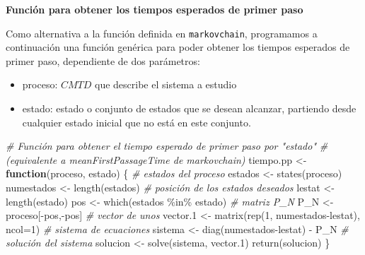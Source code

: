 \documentclass[
]{book}
\newenvironment{Shaded}{\begin{snugshade}}{\end{snugshade}}
\newcommand{\AttributeTok}[1]{\textcolor[rgb]{0.77,0.63,0.00}{#1}}
\newcommand{\CommentTok}[1]{\textcolor[rgb]{0.56,0.35,0.01}{\textit{#1}}}
\newcommand{\ControlFlowTok}[1]{\textcolor[rgb]{0.13,0.29,0.53}{\textbf{#1}}}
\newcommand{\DecValTok}[1]{\textcolor[rgb]{0.00,0.00,0.81}{#1}}
\newcommand{\FloatTok}[1]{\textcolor[rgb]{0.00,0.00,0.81}{#1}}
\newcommand{\FunctionTok}[1]{\textcolor[rgb]{0.00,0.00,0.00}{#1}}
\newcommand{\NormalTok}[1]{#1}
\newcommand{\OtherTok}[1]{\textcolor[rgb]{0.56,0.35,0.01}{#1}}
\newcommand{\SpecialCharTok}[1]{\textcolor[rgb]{0.00,0.00,0.00}{#1}}
\providecommand{\tightlist}{%
  \setlength{\itemsep}{0pt}\setlength{\parskip}{0pt}}
\newenvironment{whitebox}{
  \definecolor{shadecolor}{rgb}{255, 255, 255}  
  \color{black}
  \begin{shaded}}
 {\end{shaded}}
\theoremstyle{definition}
\theoremstyle{definition}
\theoremstyle{definition}
\theoremstyle{definition}
\theoremstyle{remark}
\begin{document}
\begin{whitebox}

\textbf{Función para obtener los tiempos esperados de primer paso}

Como alternativa a la función definida en \texttt{markovchain}, programamos a continuación una función genérica para poder obtener los tiempos esperados de primer paso, dependiente de dos parámetros:

\begin{itemize}
\tightlist
\item
  proceso: \(CMTD\) que describe el sistema a estudio
\item
  estado: estado o conjunto de estados que se desean alcanzar, partiendo desde cualquier estado inicial que no está en este conjunto.
\end{itemize}

\begin{Shaded}
\begin{Highlighting}[]
\CommentTok{\# Función para obtener el tiempo esperado de primer paso por "estado"}
\CommentTok{\# (equivalente a meanFirstPassageTime de markovchain)}
\NormalTok{tiempo.pp }\OtherTok{\textless{}{-}} \ControlFlowTok{function}\NormalTok{(proceso, estado)}
\NormalTok{\{}
  \CommentTok{\# estados del proceso}
\NormalTok{  estados }\OtherTok{\textless{}{-}} \FunctionTok{states}\NormalTok{(proceso)}
\NormalTok{  numestados }\OtherTok{\textless{}{-}} \FunctionTok{length}\NormalTok{(estados)}
  \CommentTok{\# posición de los estados deseados}
\NormalTok{  lestat }\OtherTok{\textless{}{-}} \FunctionTok{length}\NormalTok{(estado)}
\NormalTok{  pos }\OtherTok{\textless{}{-}} \FunctionTok{which}\NormalTok{(estados }\SpecialCharTok{\%in\%}\NormalTok{ estado)}
  \CommentTok{\# matriz P\_N}
\NormalTok{  P\_N }\OtherTok{\textless{}{-}}\NormalTok{ proceso[}\SpecialCharTok{{-}}\NormalTok{pos,}\SpecialCharTok{{-}}\NormalTok{pos]}
  \CommentTok{\# vector de unos}
\NormalTok{  vector}\FloatTok{.1} \OtherTok{\textless{}{-}} \FunctionTok{matrix}\NormalTok{(}\FunctionTok{rep}\NormalTok{(}\DecValTok{1}\NormalTok{, numestados}\SpecialCharTok{{-}}\NormalTok{lestat), }\AttributeTok{ncol=}\DecValTok{1}\NormalTok{)}
  \CommentTok{\# sistema de ecuaciones}
\NormalTok{  sistema }\OtherTok{\textless{}{-}} \FunctionTok{diag}\NormalTok{(numestados}\SpecialCharTok{{-}}\NormalTok{lestat) }\SpecialCharTok{{-}}\NormalTok{ P\_N}
  \CommentTok{\# solución del sistema}
\NormalTok{  solucion }\OtherTok{\textless{}{-}} \FunctionTok{solve}\NormalTok{(sistema, vector}\FloatTok{.1}\NormalTok{)}
  \FunctionTok{return}\NormalTok{(solucion)}
\NormalTok{\}}
\end{Highlighting}
\end{Shaded}

\end{whitebox}
\end{document}
